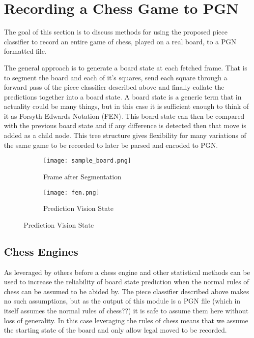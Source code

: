 \section{Recording a Chess Game to PGN}
The goal of this section is to discuss methods for using the proposed piece classifier to record an entire game of chess, played on a real board, 
to a PGN formatted file.

The general approach is to generate a board state at each fetched frame.  That is to segment the board and each of it's squares, send each square 
through a forward pass of the piece classifier described above and finally collate the predictions together into a board state.  A board state is 
a generic term that in actuality could be many things, but in this case it is sufficient enough to think of it as Forsyth-Edwards Notation (FEN).
This board state can then be compared with the previous board state and if any difference is detected then that move is added as a child node.
This tree structure gives flexibility for many variations of the same game to be recorded to later be parsed and encoded to PGN.


\begin{figure}[h]
    \centering
    \begin{subfigure}[b]{0.48\textwidth}
        \centering
        \texttt{[image: sample\_board.png]}
        \caption{Frame after Segmentation}
    \end{subfigure}
    \hfill
    \begin{subfigure}[b]{0.48\textwidth}
        \centering
        \texttt{[image: fen.png]}
        \caption{Prediction Vision State}
    \end{subfigure}
\label{fig:visionstate}
\end{figure}

\subsection{Chess Engines}
As leveraged by others before \cite{} a chess engine and other statistical methods \cite{} can be used to increase the reliability of board state 
prediction when the normal rules of chess can be assumed to be abided by.  The piece classifier described above makes no such assumptions, but as 
the output of this module is a PGN file (which in itself assumes the normal rules of chess??) it is safe to assume them here without loss of 
generality.  In this case leveraging the rules of chess means that we assume the starting state of the board and only allow legal moved to be recorded.

